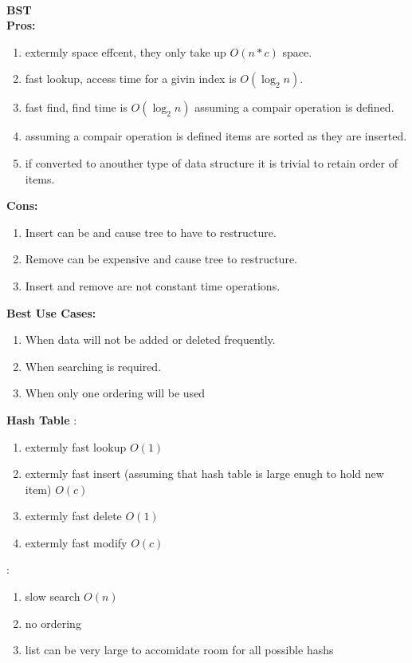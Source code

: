 \documentclass[11pt]{article}
\begin{document}
	\\
	{\bf BST}\\
	{\bf Pros:}
	\begin{enumerate}
		\item extermly space effcent, they only take up $O(n*c)$ space.
		\item fast lookup, access time for a givin index is $O(\log_{2} n)$.
		\item fast find, find time is $O(\log_{2} n)$ assuming a compair operation is defined.
		\item assuming a compair operation is defined items are sorted as they are inserted.
		\item if converted to anouther type of data structure it is trivial to retain order of items.
	\end{enumerate}
	{\bf Cons:}
	\begin{enumerate}
		\item Insert can be and cause tree to have to restructure.
		\item Remove can be expensive and cause tree to restructure.
		\item Insert and remove are not constant time operations.
	\end{enumerate}
	{\bf Best Use Cases:}
	\begin{enumerate}
		\item When data will not be added or deleted frequently.
		\item When searching is required.
		\item When only one ordering will be used
	\end{enumerate}
	{\bf Hash Table}
	{\Pros:}
	\begin{enumerate}
		\item extermly fast lookup $O(1)$
		\item extermly fast insert (assuming that hash table is large enugh to hold new item) $O(c)$
		\item extermly fast delete $O(1)$
		\item extermly fast modify $O(c)$
	\end{enumerate}
	{\Cons:}
	\begin{enumerate}
		\item slow search $O(n)$
		\item no ordering
		\item list can be very large to accomidate room for all possible hashs
	\end{enumerate}
	
	
\end{document}
